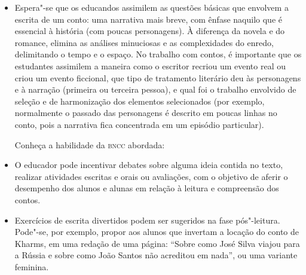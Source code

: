 \documentclass[11pt]{extarticle}
\begin{document}
\begin{itemize}
\item Espera"-se que os educandos assimilem as questões básicas que envolvem
a escrita de um conto: uma narrativa mais breve, com ênfase naquilo que
é essencial à história (com poucas personagens). À diferença da novela e
do romance, elimina as análises minuciosas e as complexidades do enredo,
delimitando o tempo e o espaço. No trabalho com contos, é importante que
os estudantes assimilem a maneira como o escritor recriou um evento real
ou criou um evento ficcional, que tipo de tratamento literário deu às
personagens e à narração (primeira ou terceira pessoa), e qual foi o
trabalho envolvido de seleção e de harmonização dos elementos
selecionados (por exemplo, normalmente o passado das personagens é
descrito em poucas linhas no conto, pois a narrativa fica concentrada em
um episódio particular).

Conheça a habilidade da \textsc{bncc} abordada:

\item O educador pode incentivar debates sobre alguma ideia contida no
texto, realizar atividades escritas e orais ou avaliações, com o
objetivo de aferir o desempenho dos alunos e alunas em relação à leitura
e compreensão dos contos.

\item Exercícios de escrita divertidos podem ser sugeridos na fase
pós"-leitura. Pode"-se, por exemplo, propor aos alunos que invertam a
locação do conto de Kharms, em uma redação de uma página: ``Sobre como
José Silva viajou para a Rússia e sobre como João Santos não acreditou
em nada'', ou uma variante feminina.



\end{itemize}
\end{document}

